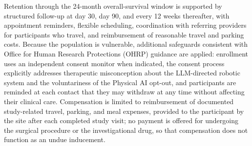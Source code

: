Retention through the 24-month overall-survival window is supported by structured
follow-up at day 30, day 90, and every 12 weeks thereafter, with appointment
reminders, flexible scheduling, coordination with referring providers for
participants who travel, and reimbursement of reasonable travel and parking costs.
Because the population is vulnerable, additional safeguards consistent with Office
for Human Research Protections (OHRP) guidance are applied: enrollment uses an
independent consent monitor when indicated, the consent process explicitly
addresses therapeutic misconception about the LLM-directed robotic system and the
voluntariness of the Physical AI opt-out, and participants are reminded at each
contact that they may withdraw at any time without affecting their clinical care.
Compensation is limited to reimbursement of documented study-related travel,
parking, and meal expenses, provided to the participant by the site after each
completed study visit; no payment is offered for undergoing the surgical procedure
or the investigational drug, so that compensation does not function as an undue
inducement.
